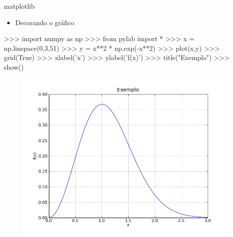 \documentclass[12pt,t,graphics]{beamer}
\begin{document}
\begin{frame}[t,fragile]{matplotlib}
	\vspace{-0.5cm}
	\begin{itemize}
		\item Decorando o gráfico
	\end{itemize}
		\begin{python}
		>>> import numpy as np
		>>> from pylab import *
		>>> x = np.linspace(0,3,51)
		>>> y = x**2 * np.exp(-x**2)
		>>> plot(x,y)
		>>> grid(True)
		>>> xlabel('x')
		>>> ylabel('f(x)')
		>>> title("Exemplo")
		>>> show()
		\end{python}
		\begin{figure}
			\centering
			\includegraphics[scale=0.225]{img/plot2.png}
		\end{figure}		
\end{frame}
\end{document}

